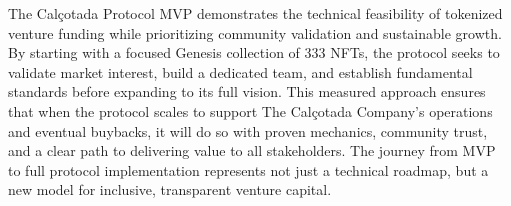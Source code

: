\documentclass[conference]{IEEEtran}
\begin{document}
The Calçotada Protocol MVP demonstrates the technical feasibility of tokenized venture funding while prioritizing community validation and sustainable growth. By starting with a focused Genesis collection of 333 NFTs, the protocol seeks to validate market interest, build a dedicated team, and establish fundamental standards before expanding to its full vision. This measured approach ensures that when the protocol scales to support The Calçotada Company's operations and eventual buybacks, it will do so with proven mechanics, community trust, and a clear path to delivering value to all stakeholders. The journey from MVP to full protocol implementation represents not just a technical roadmap, but a new model for inclusive, transparent venture capital.



\end{document}
